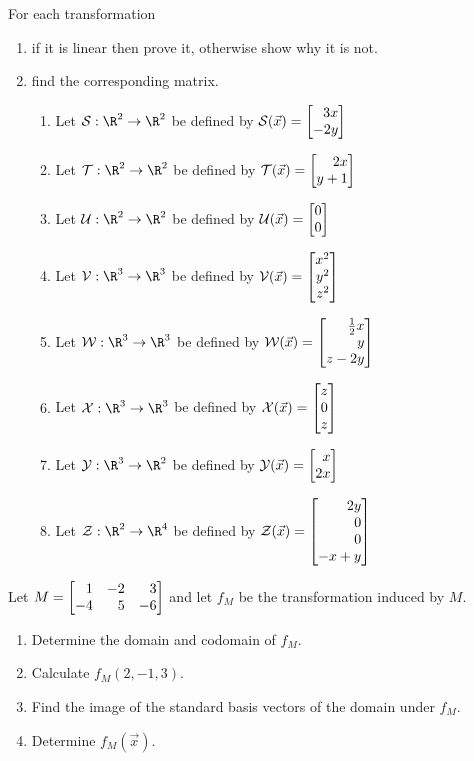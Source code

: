 \begin{exercises}
	\begin{problist}
		\prob For each transformation
		\begin{enumerate}
			\item if it is linear then prove it, otherwise
			show why it is not.
			\item find the corresponding matrix.
			\begin{enumerate}
				\item Let $\mathcal S:\R^2\to\R^2$ be defined by
				$\mathcal S(\vec x) = \mat{3x\\-2y}$
				\item Let $\mathcal T:\R^2\to\R^2$ be defined by
				$\mathcal T(\vec x) = \mat{2x\\y+1}$
				\item Let $\mathcal U:\R^2\to\R^2$ be defined by
				$\mathcal U(\vec x) = \mat{0\\0}$
				\item Let $\mathcal V:\R^3\to\R^3$ be defined by
				$\mathcal V(\vec x) = \mat{x^2\\y^2\\z^2}$
				\item Let $\mathcal W:\R^3\to\R^3$ be defined by
				$\mathcal W(\vec x) = \mat{\frac{1}{2}x\\y\\z-2y}$
				\item Let $\mathcal X:\R^3\to\R^3$ be defined by
				$\mathcal X(\vec x) = \mat{z\\0\\z}$
				\item Let $\mathcal Y:\R^3\to\R^2$ be defined by
				$\mathcal Y(\vec x) = \mat{x\\2x}$
				\item Let $\mathcal Z:\R^2\to\R^4$ be defined by
				$\mathcal Z(\vec x) = \mat{2y\\0\\0\\-x+y}$
			\end{enumerate}
		\end{enumerate}

		\prob Let $M=\mat{1&-2&3\\-4&5&-6}$ and let $f_M$ be the transformation
		induced by $M$.
		\begin{enumerate}
			\item Determine the domain and codomain of $f_M$.
			\item Calculate $f_M(2,-1,3)$.
			\item Find the image of the standard basis vectors of the domain under $f_M$.
			\item Determine $f_M(\vec x)$.
		\end{enumerate}


\end{problist}
\end{exercises}
